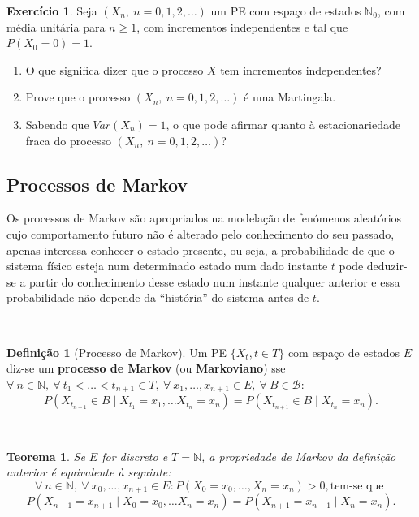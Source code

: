 \documentclass[
  11pt,
  a4paper,
]{book}
\newtheorem{theorem}{Teorema}[chapter]
\theoremstyle{definition}
\newtheorem{definition}{Definição}[chapter]
\theoremstyle{definition}
\theoremstyle{definition}
\newtheorem{exercise}{Exercício}[chapter]
\theoremstyle{definition}
\theoremstyle{remark}
\begin{document}
\begin{exercise}

Seja \((X_n, ~n=0,1,2,\dots)\) um PE com espaço de estados \(\mathbb{N}_0\), com média unitária para \(n \geq 1\), com incrementos independentes e tal que \(P(X_0=0)=1\).

\begin{enumerate}
\def\labelenumi{(\alph{enumi})}
\item
  O que significa dizer que o processo \(X\) tem incrementos independentes?
\item
  Prove que o processo \((X_n, ~n=0,1,2,\dots)\) é uma Martingala.
\item
  Sabendo que \(Var(X_n)=1\), o que pode afirmar quanto à estacionariedade fraca do processo \((X_n, ~n=0,1,2,\dots)\)?
\end{enumerate}

\end{exercise}

\subsection{Processos de Markov}\label{processos-de-markov}

Os processos de Markov são apropriados na modelação de fenómenos aleatórios cujo comportamento futuro não é alterado pelo conhecimento do seu passado, apenas interessa conhecer o estado presente, ou seja, a probabilidade de que o sistema físico esteja num determinado estado num dado instante \(t\) pode deduzir-se a partir do conhecimento desse estado num instante qualquer anterior e essa probabilidade não depende da ``história'' do sistema antes de \(t\).

\(\,\)

\begin{definition}[Processo de Markov]
Um PE \(\{X_t, t \in T\}\) com espaço de estados \(E\) diz-se um \textbf{processo de Markov} (ou \textbf{Markoviano}) sse \(\forall ~n \in \mathbb{N}, ~\forall ~t_1< \ldots < t_{n+1} \in T, ~\forall ~x_1, \ldots, x_{n+1} \in E, ~\forall ~B \in \mathcal{B}:\)
\[P(X_{t_{n+1}} \in B \mid X_{t_1}=x_1, \ldots X_{t_n}=x_n)=P(X_{t_{n+1}} \in B \mid X_{t_n}=x_n).\]
\end{definition}

\(\,\)

\begin{theorem}
Se \(E\) for discreto e \(T=\mathbb{N}\), a propriedade de Markov da definição anterior é equivalente à seguinte:
\[\forall ~n \in \mathbb{N}, ~\forall ~x_0, \ldots, x_{n+1} \in E: P(X_0=x_0, \ldots, X_n=x_n)>0, \text{tem-se que }\] \[P(X_{n+1}=x_{n+1} \mid X_{0}=x_0, \ldots X_{n}=x_n)=P(X_{n+1}=x_{n+1} \mid X_{n}=x_n).\]
\end{theorem}
\end{document}
